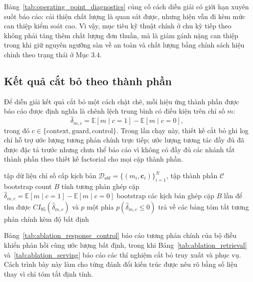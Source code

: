 ﻿\documentclass[a4paper,12pt]{article}
\begin{document}
Bảng~\ref{tab:operating_point_diagnostics} củng cố cách diễn giải có giới hạn xuyên suốt báo cáo: cải thiện chất lượng là quan sát được, nhưng hiện vẫn đi kèm mức can thiệp kiểm soát cao. Vì vậy, mục tiêu kỹ thuật chính ở chu kỳ tiếp theo không phải tăng thêm chất lượng đơn thuần, mà là giảm gánh nặng can thiệp trong khi giữ nguyên ngưỡng sàn về an toàn và chất lượng bằng chính sách hiệu chỉnh theo trạng thái ở Mục 3.4.

\subsection{Kết quả cắt bỏ theo thành phần}

Để diễn giải kết quả cắt bỏ một cách chặt chẽ, mỗi hiệu ứng thành phần được báo cáo được định nghĩa là chênh lệch trung bình có điều kiện trên chỉ số \(m\):
\begin{equation}
\hat{\delta}_{m,c}=\mathbb{E}[m\mid c=1]-\mathbb{E}[m\mid c=0],
\end{equation}
trong đó \(c\in\{\text{context},\text{guard},\text{control}\}\). Trong lần chạy này, thiết kế cắt bỏ ghi log chỉ hỗ trợ ước lượng tương phản chính trực tiếp; ước lượng tương tác đầy đủ đã được đặc tả trước nhưng chưa thể báo cáo vì không có đầy đủ các nhánh tắt thành phần theo thiết kế factorial cho mọi cặp thành phần.

\begin{algorithm}[H]
\caption{Ước lượng hiệu ứng cắt bỏ theo tương phản chính}
\begin{algorithmic}[1]
\Require tập dữ liệu chỉ số cấp kịch bản \(\mathcal{D}_{abl}=\{(m_i,\mathbf{c}_i)\}_{i=1}^{N}\), tập thành phần \(\mathcal{C}\)
\Require bootstrap count \(B\)
    \State tính tương phản ghép cặp \(\hat{\delta}_{m,c}=\mathbb{E}[m\mid c{=}1]-\mathbb{E}[m\mid c{=}0]\)
    \State bootstrap các kịch bản ghép cặp \(B\) lần để thu được \(CI_{95}(\hat{\delta}_{m,c})\) và \(p\) một phía \(p(\hat{\delta}_{m,c}\le0)\)
  \EndFor
\EndFor
\State trả về các bảng tóm tắt tương phản chính kèm độ bất định
\end{algorithmic}
\end{algorithm}

Bảng~\ref{tab:ablation_response_control} báo cáo tương phản chính của bộ điều khiển phản hồi cùng ước lượng bất định, trong khi Bảng~\ref{tab:ablation_retrieval} và~\ref{tab:ablation_serving} báo cáo các thí nghiệm cắt bỏ truy xuất và phục vụ. Cách trình bày này làm cho từng đánh đổi kiến trúc được nêu rõ bằng số liệu thay vì chỉ tóm tắt định tính.
\end{document}
